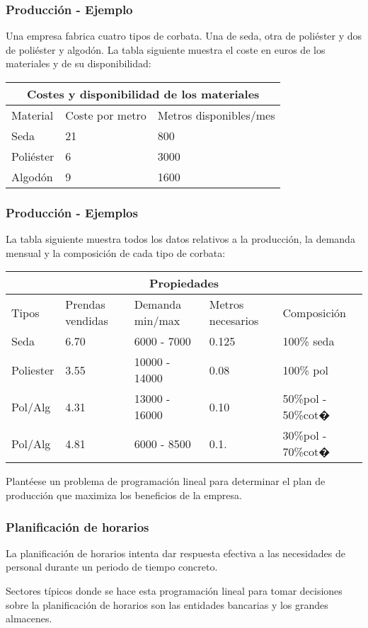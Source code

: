 \documentclass{beamer}
\begin{document}
\begin{frame}
\frametitle{Producci\'on - Ejemplo}
Una empresa fabrica cuatro tipos de corbata. Una de seda, otra de poli\'ester y dos de poli\'ester y algod\'on. La tabla siguiente muestra el coste en euros de los materiales y de su disponibilidad:
\begin{tabular}{ |p{2.5cm}||p{2.8cm}|p{4cm}|  }
 \hline
 \multicolumn{3}{|c|}{Costes y disponibilidad de los materiales} \\
 \hline
 Material & Coste por metro & Metros disponibles/mes\\
 \hline
 Seda   & 21    &800\\
 Poli\'ester &   6  & 3000\\
 Algod\'on &   9  & 1600\\
 \hline
\end{tabular}
\end{frame}

\begin{frame}
\frametitle{Producci\'on - Ejemplos}
La tabla siguiente muestra todos los datos relativos a la producci\'on, la demanda mensual y la composici\'on de cada tipo de corbata:
\begin{tabular}{ |p{1.5cm}||p{1.8cm}|p{2.4cm}|p{1.6cm}|p{2cm}|  }
 \hline
 \multicolumn{5}{|c|}{Propiedades} \\
 \hline
 Tipos& Prendas vendidas &Demanda min/max & Metros necesarios & Composici\'on\\
 \hline
 Seda   & 6.70    &6000 - 7000 &  0.125 & 100\% seda\\
 Poliester   & 3.55    &10000 - 14000 &  0.08 & 100\% pol\\
 Pol/Alg   & 4.31    &13000 - 16000 &  0.10 & 50\%pol - 50\%cot�\\
 Pol/Alg   & 4.81    &6000 - 8500 &  0.1. & 30\%pol - 70\%cot�\\
 \hline
\end{tabular}
Plant\'eese un problema de programaci\'on lineal para determinar el plan de producci\'on que maximiza los beneficios de la empresa.
\end{frame}


\begin{frame}
\frametitle{Planificaci\'on de horarios}
La planificaci\'on de horarios intenta dar respuesta efectiva a las necesidades de personal durante un periodo de tiempo concreto.

Sectores t\'ipicos donde se hace esta programaci\'on lineal para tomar decisiones sobre la planificaci\'on de horarios son las entidades bancarias y los grandes almacenes.
\end{frame}
\end{document}
